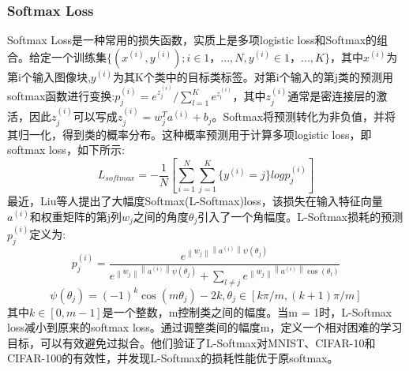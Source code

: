 \documentclass[final]{cvpr}
\begin{document}
\subsubsection{Softmax Loss}

Softmax Loss是一种常用的损失函数，实质上是多项logistic loss和Softmax的组合。给定一个训练集$\{(x^{(i)}, y^{(i)});i\in1，. . .,N,y^{(i)}\in1，. . ., K\}$，其中$x^{(i)}$为第i个输入图像块,$y^{(i)}$为其K个类中的目标类标签。对第i个输入的第j类的预测用softmax函数进行变换:$p^{(i)}_j=e^{z_j^{(i)}}/\sum_{l=1}^Ke^{z_l^{(i)}}$，其中$z_j^{(i)}$通常是密连接层的激活，因此$z_j^{(i)}$可以写成$z_j^{(i)}=w^T_ja^{(i)}+b_j$。Softmax将预测转化为非负值，并将其归一化，得到类的概率分布。这种概率预测用于计算多项logistic loss，即softmax loss，如下所示:
\begin{equation}
	L_{softmax}=-\frac{1}{N}[\sum_{i=1}^N\sum_{j=1}^K\{y^{(i)}=j\}logp_j^{(i)}]
\end{equation}
最近，Liu等人提出了大幅度Softmax(L-Softmax)loss，该损失在输入特征向量$a^{(i)}$和权重矩阵的第j列$w_j$之间的角度$\theta_j$引入了一个角幅度。L-Softmax损耗的预测$p^{(i)}_j$定义为:
\begin{equation}
	p^{(i)}_j=\frac{e^{\left\|w_j\right\| \left\|a^{(i)}\right\| \psi(\theta_j)}}{e^{\left\|w_j\right\| \left\|a^{(i)}\right\| \psi(\theta_j)} +\sum_{l\neq j}e^{\left\|w_j\right\| \left\|a^{(i)}\right\| \cos(\theta_l)}}
\end{equation}
\begin{equation}
	\psi(\theta_j)=(-1)^k\cos(m\theta_j)-2k,\theta_j\in[k\pi/m,(k+1)\pi/m]
\end{equation}
其中$k\in[0,m-1]$是一个整数，m控制类之间的幅度。当m = 1时，L-Softmax loss减小到原来的softmax loss。通过调整类间的幅度m，定义一个相对困难的学习目标，可以有效避免过拟合。他们验证了L-Softmax对MNIST、CIFAR-10和CIFAR-100的有效性，并发现L-Softmax的损耗性能优于原softmax。
\end{document}
